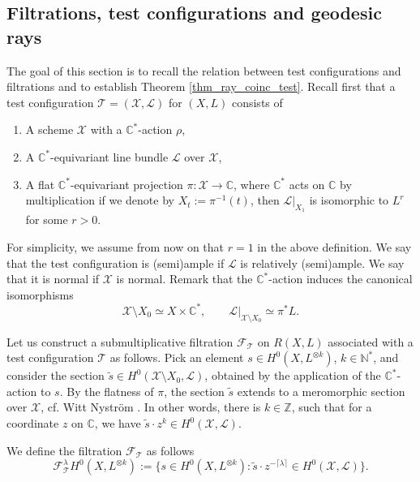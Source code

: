 \documentclass[12pt]{article}
\numberwithin{equation}{section}
\theoremstyle{theorem}
\theoremstyle{definition}
\theoremstyle{remark}
\newcommand{\comp}{\mathbb{C}}
\newcommand{\nat}{\mathbb{N}}
\newcommand{\integ}{\mathbb{Z}}
\begin{document}
		
	\subsection{Filtrations, test configurations and geodesic rays}\label{sect_filt}
	The goal of this section is to recall the relation between test configurations and filtrations and to establish Theorem \ref{thm_ray_coinc_test}.
	Recall first that a test configuration $\mathcal{T} = (\mathcal{X}, \mathcal{L})$ for $(X, L)$ consists of
	\begin{enumerate}
		\item A scheme $\mathcal{X}$ with a $\comp^*$-action $\rho$,
		\item A $\comp^*$-equivariant line bundle $\mathcal{L}$ over $\mathcal{X}$,
		\item A flat $\comp^*$-equivariant projection $\pi : \mathcal{X} \to \comp$, where $\comp^*$ acts on $\comp$ by multiplication if we denote by $X_t := \pi^{-1}(t)$, then $\mathcal{L}|_{X_1}$ is isomorphic to $L^r$ for some $r > 0$.
	\end{enumerate}
	For simplicity, we assume from now on that $r = 1$ in the above definition.
	We say that the test configuration is (semi)ample if $\mathcal{L}$ is relatively (semi)ample.
	We say that it is normal if $\mathcal{X}$ is normal.
	Remark that the $\comp^*$-action induces the canonical isomorphisms
	\begin{equation}\label{eq_can_ident_test}
		\mathcal{X} \setminus X_0 \simeq X \times \comp^*, \qquad \mathcal{L}|_{\mathcal{X} \setminus X_0} \simeq \pi^* L.
	\end{equation}
	\par 
	Let us construct a submultiplicative filtration  $\mathcal{F}_{\mathcal{T}}$ on $R(X, L)$ associated with a test configuration $\mathcal{T}$ as follows.
	Pick an element $s \in H^0(X, L^{\otimes k})$, $k \in \nat^*$, and consider the section $\tilde{s} \in H^0(\mathcal{X} \setminus X_0, \mathcal{L})$, obtained by the application of the $\comp^*$-action to $s$.
	By the flatness of $\pi$, the section $\tilde{s}$ extends to a meromorphic section over $\mathcal{X}$, cf. Witt Nystr{\"o}m \cite[Lemma 6.1]{NystOkounTest}.
	In other words, there is $k \in \integ$, such that for a coordinate $z$ on $\comp$, we have $\tilde{s} \cdot z^{k} \in H^0(\mathcal{X}, \mathcal{L})$.
	\par 
	We define the filtration $\mathcal{F}_{\mathcal{T}}$ as follows
	\begin{equation}
		\mathcal{F}_{\mathcal{T}}^{\lambda} H^0(X, L^{\otimes k})
		:=
		\Big\{
			s \in H^0(X, L^{\otimes k}) : \tilde{s} \cdot z^{- \lceil \lambda \rceil} \in H^0(\mathcal{X}, \mathcal{L})
		\Big\}.
	\end{equation}
\end{document}
